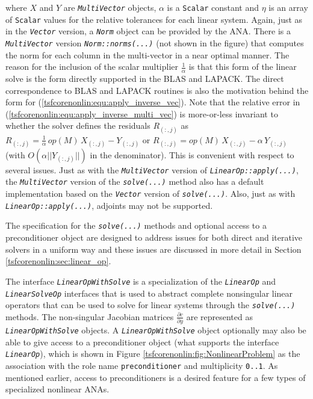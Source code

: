 where $X$ and $Y$ are \texttt{\textit{MultiVector}} objects, $\alpha$
is a \texttt{Scalar} constant and $\eta$ is an array of
\texttt{Scalar} values for the relative
tolerances for each linear system.  Again, just as in the
\texttt{\textit{Vector}} version, a \texttt{\textit{Norm}} object can
be provided by the ANA.  There is a \texttt{\textit{MultiVector}}
version \texttt{\textit{Norm\-::norms(...)}} (not shown in the figure)
that computes the norm for each column in the multi-vector in a near
optimal manner.  The reason for the inclusion of the scalar multiplier
$\frac{1}{\alpha}$ is that this form of the linear solve is the form
directly supported in the BLAS and LAPACK.  The direct correspondence
to BLAS and LAPACK routines is also the motivation behind the form for
(\ref{tsfcorenonlin:equ:apply_inverse_vec}).  Note that the relative error in
(\ref{tsfcorenonlin:equ:apply_inverse_multi_vec}) is more-or-less invariant to
whether the solver defines the residuals $R_{(:,j)}$ as $R_{(:,j)} =
\frac{1}{\alpha}\,op(M)\,X_{(:,j)} - Y_{(:,j)}$ or $R_{(:,j)} =
op(M)\,X_{(:,j)} - \alpha\,Y_{(:,j)}$ (with $O(\alpha||Y_{(:,j)}||)$ in
the denominator).  This is convenient with respect to several issues.
Just as with the \texttt{\textit{MultiVector}} version of
\texttt{\textit{LinearOp\-::apply(...)}}, the
\texttt{\textit{MultiVector}} version of the
\texttt{\textit{solve(...)}} method also has a default implementation based
on the \texttt{\textit{Vector}} version of
\texttt{\textit{solve(...)}}.  Also, just as with
\texttt{\textit{LinearOp\-::apply(...)}}, adjoints may not be supported.

The specification for the \texttt{\textit{solve(...)}} methods
and optional access to a preconditioner object are designed to address
issues for both direct and iterative solvers in a uniform way and
these issues are discussed in more detail in Section
\ref{tsfcorenonlin:sec:linear_op}.

The interface \texttt{\textit{Linear\-Op\-With\-Solve}} is a specialization
of the \texttt{\textit{LinearOp}} and \texttt{\textit{Linear\-Solve\-Op}}
interfaces that is used to abstract complete nonsingular linear
operators that can be used to solve for linear systems through the
\texttt{\textit{solve(...)}} methods.  The non-singular
Jacobian matrices $\frac{\partial c}{\partial y}$ are represented as
\texttt{\textit{Linear\-Op\-With\-Solve}} objects.
A \texttt{\textit{Linear\-Op\-With\-Solve}} object optionally may also be
able to give access to a preconditioner object (what supports the
interface \texttt{\textit{LinearOp}}), which is shown in Figure
\ref{tsfcorenonlin:fig:NonlinearProblem} as the  association with the role name
\texttt{preconditioner} and multiplicity \texttt{0..1}.  As mentioned
earlier, access to preconditioners is a desired feature for a few types
of specialized nonlinear ANAs.

